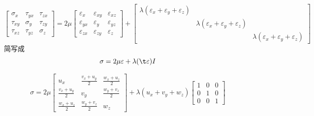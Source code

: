 \documentclass[12pt,a4paper]{article}
\begin{document}
$$
\begin{bmatrix}
\sigma _x & \tau_{yx} & \tau_{zx} \\
\tau_{xy} & \sigma _y & \tau_{zy} \\
\tau_{xz} & \tau_{yz} & \sigma _z
\end{bmatrix}=
2\mu\begin{bmatrix}
\varepsilon_x & \varepsilon_{xy} & \varepsilon_{xz} \\
\varepsilon_{yx} & \varepsilon_{y} & \varepsilon_{yz} \\
\varepsilon_{zx} & \varepsilon_{zy} & \varepsilon_{z}
\end{bmatrix}+\begin{bmatrix}
\lambda(\varepsilon_x+\varepsilon_y+\varepsilon_z) &  &  \\
 & \lambda(\varepsilon_x+\varepsilon_y+\varepsilon_z) &  \\
 &  & \lambda(\varepsilon_x+\varepsilon_y+\varepsilon_z)
\end{bmatrix}
$$
简写成
$$
\sigma = 2\mu \varepsilon + \lambda(\t \varepsilon) I
$$

$$
\sigma =
2
\mu
\begin{bmatrix}
u_x & \frac{v_x + u_y}{2} & \frac{w_x + u_z}{2} \\
\frac{v_x + u_y}{2} & v_y & \frac{w_y + v_z}{2} \\
\frac{w_x + u_z}{2} & \frac{w_y + v_z}{2} & w_z 
\end{bmatrix}
+ 
\lambda (u_x + v_y + w_z)
\begin{bmatrix}
1 & 0 & 0 \\
0 & 1 & 0 \\
0 & 0 & 1 
\end{bmatrix}
$$
\end{document}
